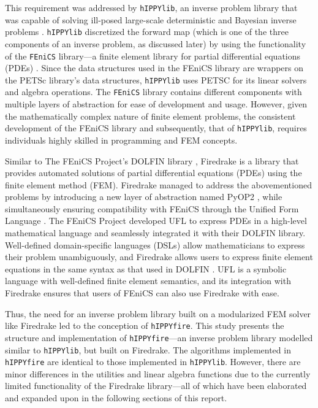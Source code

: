 This requirement was addressed by \texttt{hIPPYlib}, an inverse problem library that was capable of solving ill-posed large-scale deterministic and Bayesian inverse problems \cite{villa2018hippylib}. \texttt{hIPPYlib} discretized the forward map (which is one of the three components of an inverse problem, as discussed later) by using the functionality of the \texttt{FEniCS} library---a finite element library for partial differential equations (PDEs) \cite{alnaes2015fenics}. Since the data structures used in the FEniCS library are wrappers on the PETSc library's data structures, \texttt{hIPPYlib} uses PETSC \cite{balay2001petsc} for its linear solvers and algebra operations. The \texttt{FEniCS} library contains different components with multiple layers of abstraction for ease of development and usage. However, given the mathematically complex nature of finite element problems, the consistent development of the FEniCS library and subsequently, that of \texttt{hIPPYlib}, requires individuals highly skilled in programming and FEM concepts.

Similar to The FEniCS Project's DOLFIN library \cite{alnaes2015fenics, logg2010dolfin}, Firedrake \cite{rathgeber2016firedrake} is a library that provides automated solutions of partial differential equations (PDEs) using the finite element method (FEM). Firedrake managed to address the abovementioned problems by introducing a new layer of abstraction named PyOP2 \cite{rathgeber2012pyop2}, while simultaneously ensuring compatibility with FEniCS through the Unified Form Language \cite{alnaes2014unified}. The FEniCS Project developed UFL \cite{alnaes2014unified} to express PDEs in a high-level mathematical language and seamlessly integrated it with their DOLFIN library. Well-defined domain-specific languages (DSLs) allow mathematicians to express their problem unambiguously, and Firedrake allows users to express finite element equations in the same syntax as that used in DOLFIN \cite{logg2010dolfin}. UFL is a symbolic language with well-defined finite element semantics, and its integration with Firedrake ensures that users of FEniCS can also use Firedrake with ease.  

Thus, the need for an inverse problem library built on a modularized FEM solver like Firedrake led to the conception of \texttt{hIPPYfire}. This study presents the structure and implementation of \texttt{hIPPYfire}---an inverse problem library modelled similar to \texttt{hIPPYlib}, but built on Firedrake. The algorithms implemented in \texttt{hIPPYfire} are identical to those implemented in \texttt{hIPPYlib}. However, there are minor differences in the utilities and linear algebra functions due to the currently limited functionality of the Firedrake library---all of which have been elaborated and expanded upon in the following sections of this report.

